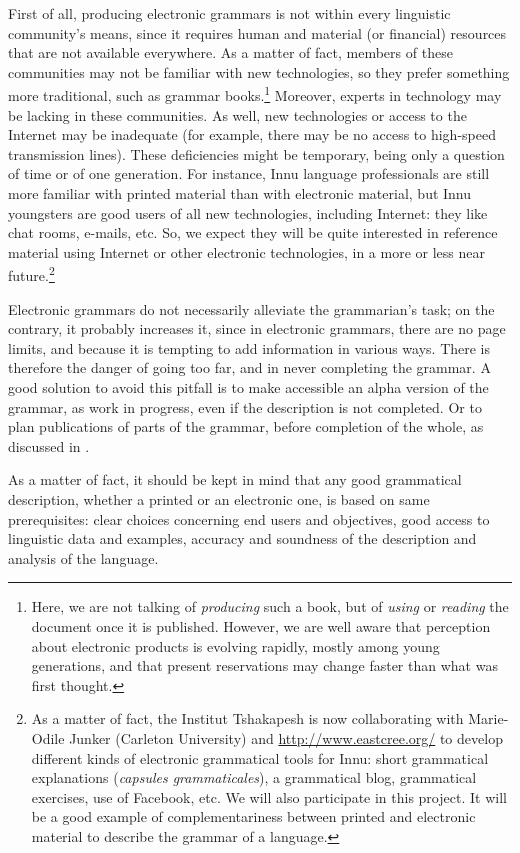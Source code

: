 First of all, producing electronic grammars is not within every linguistic community's means, since it requires human and material (or financial) resources that are not available everywhere. As a matter of fact, members of these communities may not be familiar with new technologies, so they prefer something more traditional, such as grammar books.\footnote{Here,
 we are not talking of \textit{producing }such a book, but of \textit{using} or \textit{reading} the document once it is published. However, we are well aware that perception about electronic products is evolving rapidly, mostly among young generations, and that present reservations may change faster than what was first thought.
} 
Moreover, experts in technology may be lacking in these communities. As well, new technologies or access to the Internet may be inadequate (for example, there may be no access to high-speed transmission lines). These deficiencies might be temporary, being only a question of time or of one generation. For instance, Innu language professionals are still more familiar with printed material than with electronic material, but Innu youngsters are good users of all new technologies, including Internet: they like chat rooms, e-mails, etc. So, we expect they will be quite interested in reference material using Internet or other electronic technologies, in a more or less near future.\footnote{As
 a matter of fact, the Institut Tshakapesh is now collaborating with Marie-Odile Junker (Carleton University) and \url{http://www.eastcree.org/}
 to develop different kinds of electronic grammatical tools for Innu: short grammatical explanations (\textit{capsules grammaticales}), a grammatical blog, grammatical exercises, use of Facebook, etc. We will also participate in this project. It will be a good example of complementariness between printed and electronic material to describe the grammar of a language.
}


Electronic grammars do not necessarily alleviate the grammarian's task; on the contrary, it probably increases it, since in electronic grammars, there are no page limits, and because it is tempting to add information in various ways. There is therefore the danger of going too far, and in never completing the grammar. A good solution to avoid this pitfall is to make accessible an alpha version of the grammar, as work in progress, even if the description is not completed. Or to plan publications of parts of the grammar, before completion of the whole, as discussed in  \citet{Nordhoff2008}.

As a matter of fact, it should be kept in mind that any good grammatical description, whether a printed or an electronic one, is based on same prerequisites: clear choices concerning end users and objectives, good access to linguistic data and examples, accuracy and soundness of the description and analysis of the language.

